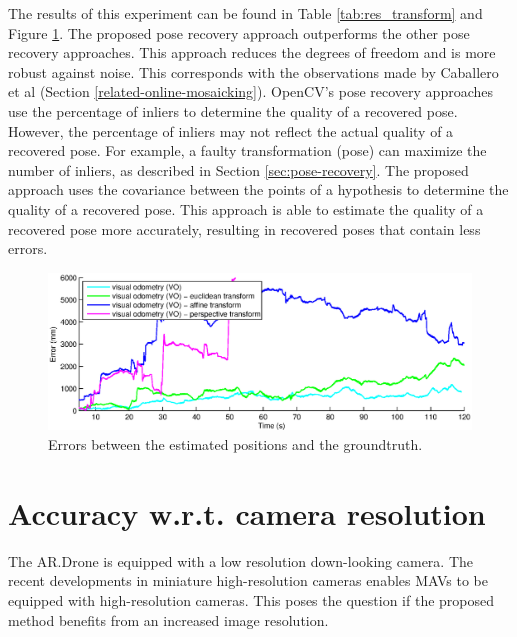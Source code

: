The results of this experiment can be found in Table \ref{tab:res_transform} and Figure \ref{fig:exp4-transform-error}.
The proposed pose recovery approach outperforms the other pose recovery approaches.
This approach reduces the degrees of freedom and is more robust against noise.
This corresponds with the observations made by Caballero et al (Section \ref{related-online-mosaicking}).
OpenCV's pose recovery approaches use the percentage of inliers to determine the quality of a recovered pose.
However, the percentage of inliers may not reflect the actual quality of a recovered pose.
For example, a faulty transformation (pose) can maximize the number of inliers, as described in Section \ref{sec:pose-recovery}.
The proposed approach uses the covariance between the points of a hypothesis to determine the quality of a recovered pose.
This approach is able to estimate the quality of a recovered pose more accurately, resulting in recovered poses that contain less errors.


\begin{figure}[htb!]
\centering
\includegraphics[width=\linewidth]{images/exp4-transform-error.eps}
\caption{Errors between the estimated positions and the groundtruth.}
\label{fig:exp4-transform-error}
\end{figure}





\clearpage
\section{Accuracy w.r.t. camera resolution}
\label{sec:res-cam-resolution}
The AR.Drone is equipped with a low resolution down-looking camera.
The recent developments in miniature high-resolution cameras enables MAVs to be equipped with high-resolution cameras.
This poses the question if the proposed method benefits from an increased image resolution.


